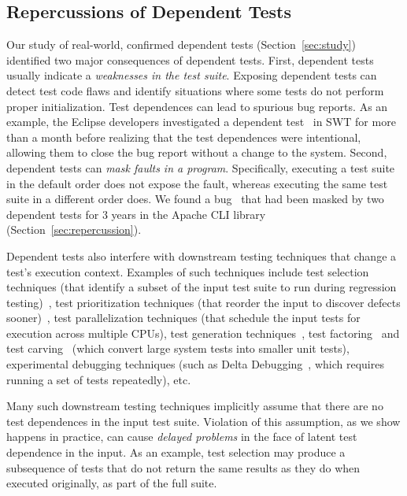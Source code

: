 \subsection{Repercussions of Dependent Tests}


Our study of \dtnum real-world, confirmed dependent
tests 
(Section~\ref{sec:study}) identified two 
major consequences of dependent tests.
%
First, dependent tests usually indicate a
\emph{weaknesses in the test suite}. Exposing
dependent tests can detect test code flaws and identify situations
where some tests do not perform proper initialization.
Test dependences can lead
to {spurious bug reports}. As an example, the Eclipse developers
investigated a dependent test~\cite{eclipsebug} in SWT for
more than a month before realizing that the test dependences were intentional,
allowing them to close the bug report without a change to the system.
%
Second, dependent tests can
\emph{mask faults in a program}. Specifically, executing a test suite in the
default order does not expose the fault, whereas
executing the same test suite in a different order does. We found 
a bug~\cite{clibug} that had been masked by two dependent tests
for 3 years in the Apache CLI library~\cite{cli} (Section~\ref{sec:repercussion}).


Dependent tests also interfere with downstream testing
techniques that change a test's execution context.
Examples of such techniques include
test selection techniques (that identify a subset of
the input test suite to run during
regression testing)~\cite{harroldetal:OOPSLA:2001},
test prioritization techniques (that reorder the
input to discover defects sooner)~\cite{Elbaum:2000:PTC:347324.348910},
test parallelization techniques (that schedule the input tests for execution across multiple
CPUs), test generation techniques~\cite{PachecoLET2007, SPLAT},
test factoring~\cite{Saff:2005} and test carving~\cite{Elbaum:2006} (which
convert large system tests into smaller unit tests),
experimental debugging techniques (such as Delta Debugging~\cite{Zeller:2002},
which requires running a set of tests repeatedly), etc. 

Many such downstream testing techniques implicitly assume that
there are no test dependences in the input test suite.  Violation of
this assumption, as we show happens in practice, can cause \emph{delayed problems} in the face
of latent test dependence in the input.  As an
example, test selection may produce a subsequence of tests that do not
return the same results as they do when executed originally, as part of the full suite.


